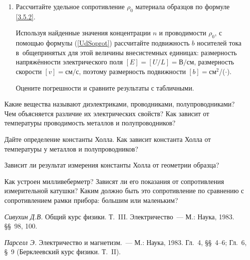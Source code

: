 \begin{lab:task}
\begin{enumerate}
{Для цинка изобразите на графике зависимость $V_{xy}=f(B)$ и по наклону прямой рассчитайте постоянную Холла.

Для обоих образцов рассчитайте концентрацию $n$ носителей тока по формуле (\ref{HallConstant}).

Оцените погрешности и сравните результаты с табличными.}

\item{ Рассчитайте удельное сопротивление $\rho_0$ материала образцов по формуле \eqref{3.5.2}.

Используя найденные значения концентрации $n$ и проводимости $\rho_0$, с помощью формулы (\ref{UdSoprot}) рассчитайте подвижность $b$ носителей тока в~общепринятых для этой величины внесистемных единицах: размерность напряжённости электрического поля $[E] = [U/L]=\text{В/см}$, размерность скорости $[v]=\text{см/с}$, поэтому размерность подвижности $[b]=$см$^2$/($\cdot$).

Оцените погрешности и сравните результаты с табличными.
}
\end{enumerate}

\end{lab:task}

\begin{lab:questions}

\item{ Какие вещества называют диэлектриками, проводниками, полупроводниками? Чем объясняется различие их электрических свойств? Как зависит от температуры проводимость металлов и полупроводников?}

\item{ Дайте определение константы Холла. Как зависит константа Холла от температуры у металлов и полупроводников?}

\item{ Зависит ли результат измерения константы Холла от геометрии образца?}

\item{ Как устроен милливеберметр? Зависят ли его показания от сопротивления измерительной катушки? Каким должно быть это сопротивление по сравнению с сопротивлением рамки прибора: большим или маленьким?}

\end{lab:questions}

\begin{lab:literature}

\item{ \emph{Сивухин Д.В.} Общий курс физики. Т.~III. Электричество~--- М.: Наука, 1983. \S\S~98, 100.}

\item{ \emph{Парселл Э.} Электричество и магнетизм.~--- М.: Наука, 1983. Гл.~4, \S\S~4--6; Гл.~6, \S~9 (Берклеевский курс физики. Т.~II).}
\end{lab:literature}
